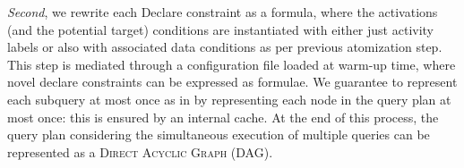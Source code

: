 \textit{Second}, we rewrite each Declare constraint as a \xLTLf formula, where the activations (and the potential target) conditions are instantiated with either just activity labels or also with associated data conditions as per previous atomization step. This step is mediated through a configuration file loaded at warm-up time, where novel declare constraints can be expressed as \xLTLf formulae. We guarantee to represent each subquery at most once as in \cite{BellatrecheKB21} by representing each node in the query plan at most once: this is ensured by an internal cache. At the end of this process, the query plan considering the simultaneous execution of multiple queries can be represented as a \textsc{Direct Acyclic Graph} (DAG).  
